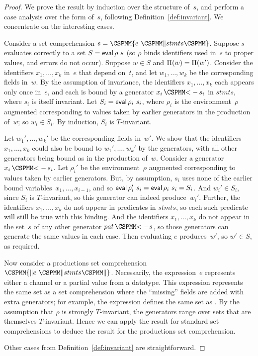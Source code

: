 \begin{proof}
We prove the result by induction over the structure of~$s$, and perform a case
analysis over the form of~$s$, following Definition~\ref{def:invariant}.  We
concentrate on the interesting cases.

Consider a set comprehension $s = \M\{ e ~ \M\| stmts \M\}$.  Suppose $s$
evaluates correctly to a set $S = \mathop{\sf eval} \rho~s$ (so $\rho$ binds identifiers
used in~$s$ to proper values, and errors do not occur).  Suppose $w \in S$ and
$\Pi(w) = \Pi(w')$.  Consider the identifiers $x_1,\ldots,x_k$ in~$e$
that depend on~$t$, and let $w_1,\ldots,w_k$ be the corresponding fields
in~$w$.  By the assumption of invariance, the identifiers $x_1,\ldots,x_k$
each appears only once in~$e$, and each is bound by a generator $x_i
\,\M{<-}\, s_i$ in $stmts$, where $s_i$ is itself invariant.  Let $S_i = \mathop{\sf eval}
\rho_i~s_i$, where $\rho_i$ is the environment~$\rho$ augmented corresponding
to values taken by earlier generators in the production of~$w$; so $w_i \in
S_i$.  By induction, $S_i$ is $T$-invariant.

Let $w_1',\ldots,w_k'$ be the corresponding fields in~$w'$.  We show that the
identifiers $x_1,\ldots,x_k$ could also be bound to $w_1',\ldots,w_k'$ by the
generators, with all other generators being bound as in the production of~$w$.
Consider a generator $x_i \,\M{<-}\, s_i$.  Let $\rho_i'$ be the
environment~$\rho$ augmented corresponding to values taken by earlier
generators.  But, by assumption, $s_i$ uses none of the earlier bound
variables~$x_1,\ldots,x_{i-1}$, and so 
%
$\mathop{\sf eval} \rho_i'~s_i = \mathop{\sf eval} \rho_i~s_i = S_i$.  And $w_i' \in S_i$, since $S_i$
is $T$-invariant, so this generator can indeed produce~$w_i'$.  Further, the
identifiers $x_1,\ldots,x_k$ do not appear in predicates in $stmts$, so each
such predicate will still be true with this binding.  And the identifiers
$x_1,\ldots,x_k$ do not appear in the set~$s$ of any other generator $pat
\,\M{<-} s$, so those generators can generate the same values in each case.
Then evaluating $e$ produces~$w'$, so $w' \in S$, as required.

Now consider a productions set comprehension $\M{\{\|} e ~ \M\| stmts
\M{\|\}}$.  Necessarily, the expression~$e$ represents either a channel or a
partial value from a datatype.  This expression represents the same set as a
set comprehension where the ``missing'' fields are added with extra
generators; for example, the expression  defines the same
set as .  By the assumption that
$\rho$ is strongly $T$-invariant, the generators range over sets that are
themselves $T$-invariant.  Hence we can apply the result for standard set
comprehensions to deduce the result for the productions set comprehension.

Other cases from Definition~\ref{def:invariant} are straightforward.
\end{proof}

